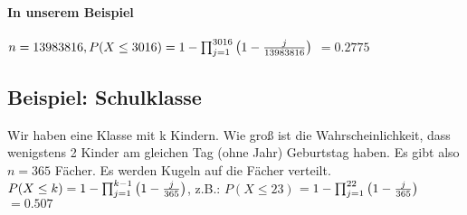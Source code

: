 \paragraph{In unserem Beispiel} $n=13 983 816, P(X\leq 3016) = 1 - \prod_{j=1}^{3016}  \left( 1-\frac{j}{13 983 816} \right) $
$= 0.2775$

\subsection{Beispiel: Schulklasse}
Wir haben eine Klasse mit k Kindern. Wie groß ist die Wahrscheinlichkeit, dass wenigstens 2 Kinder am gleichen Tag (ohne Jahr) Geburtstag haben. Es gibt also $n=365$ Fächer. Es werden Kugeln auf die Fächer verteilt. \\
$P(X\leq k) = 1 - \prod_{j=1}^{k-1}  \left( 1-\frac{j}{365} \right) $, z.B.: $P(X\leq 23) $
$= 1 - \prod_{j=1}^{22}  \left( 1-\frac{j}{365} \right) $
$= 0.507$